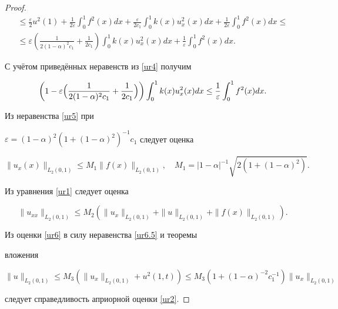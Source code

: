 \begin{proof}
\begin{multline*}
\leq\frac{\varepsilon}{2}u^2(1)+\frac{1}{2\varepsilon}\int_{0}^{1}f^2(x)dx+

\frac{\varepsilon

}{2c_1}\int_{0}^{1}k(x)u_x^2(x)dx+\frac{1}{2\varepsilon}\int_{0}^{1}f^2(x)dx\leq

\\

\leq\varepsilon

\left(\frac{1}{2(1-\alpha)^2c_1}+\frac{1}{2c_1}\right)\int_{0}^{1}k(x)u_x^2(x)dx+\frac{1}{\varepsilon}\int_{0}^{1}f^2(x)dx.

\end{multline*}



С учётом приведённых неравенств из \eqref{ur4} получим

\begin{equation}

\left(1-\varepsilon

\Bigl(\frac{1}{2(1-\alpha)^2c_1}+\frac{1}{2c_1}\Bigr)\right)\int_{0}^{1}k(x)u_x^2(x)dx

\leq \frac{1}{\varepsilon}\int_{0}^{1}f^2(x)dx. \label{ur5}

\end{equation}



Из неравенства \eqref{ur5} при

$\varepsilon=(1-\alpha)^2(1+(1-\alpha)^2)^{-1}c_1$ следует оценка

\begin{equation}

\|u_x(x)\|_{L_{2}(0, 1)}\leq M_1\|f(x)\|_{L_2(0, 1)},

\quad M_1=|1-\alpha|^{-1}\sqrt{2(1+(1-\alpha)^2)}. \label{ur6}

\end{equation}

Из уравнения \eqref{ur1} следует оценка

\begin{equation}

\|u_{xx}\|_{L_2(0, 1)}\leq

M_2\left(\|u_x\|_{L_2(0, 1)}+\|u\|_{L_2(0, 1)}+\|f(x)\|_{L_2(0, 1)}\right).

\label{ur6.5}

\end{equation}



Из оценки \eqref{ur6} в силу неравенства \eqref{ur6.5} и теоремы

вложения

$$

\|u\|_{L_2(0, 1)}\leq M_3(\|u_x\|_{L_2(0, 1)}+u^2(1,t))\leq

M_3(1+(1-\alpha)^{-2}c_1^{-1})\|u_x\|_{L_2(0, 1)}

$$

следует справедливость априорной оценки \eqref{ur2}.

\end{proof}



